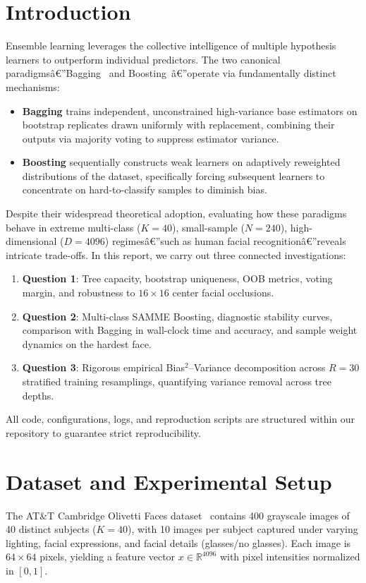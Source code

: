 \documentclass[10pt,twocolumn,letterpaper]{article}
\begin{document}
\section{Introduction}
\label{sec:intro}
Ensemble learning leverages the collective intelligence of multiple hypothesis learners to outperform individual predictors. The two canonical paradigmsâ€”Bagging~\cite{breiman1996bagging} and Boosting~\cite{zhu2009multi}â€”operate via fundamentally distinct mechanisms:
\begin{itemize}
    \item \textbf{Bagging} trains independent, unconstrained high-variance base estimators on bootstrap replicates drawn uniformly with replacement, combining their outputs via majority voting to suppress estimator variance.
    \item \textbf{Boosting} sequentially constructs weak learners on adaptively reweighted distributions of the dataset, specifically forcing subsequent learners to concentrate on hard-to-classify samples to diminish bias.
\end{itemize}

Despite their widespread theoretical adoption, evaluating how these paradigms behave in extreme multi-class ($K=40$), small-sample ($N=240$), high-dimensional ($D=4096$) regimesâ€”such as human facial recognitionâ€”reveals intricate trade-offs. In this report, we carry out three connected investigations:
\begin{enumerate}
    \item \textbf{Question 1}: Tree capacity, bootstrap uniqueness, OOB metrics, voting margin, and robustness to $16 \times 16$ center facial occlusions.
    \item \textbf{Question 2}: Multi-class SAMME Boosting, diagnostic stability curves, comparison with Bagging in wall-clock time and accuracy, and sample weight dynamics on the hardest face.
    \item \textbf{Question 3}: Rigorous empirical Bias$^2$--Variance decomposition across $R=30$ stratified training resamplings, quantifying variance removal across tree depths.
\end{enumerate}

All code, configurations, logs, and reproduction scripts are structured within our repository to guarantee strict reproducibility.

\section{Dataset and Experimental Setup}
\label{sec:setup}
The AT\&T Cambridge Olivetti Faces dataset~\cite{samaria1994parameterisation} contains 400 grayscale images of 40 distinct subjects ($K=40$), with 10 images per subject captured under varying lighting, facial expressions, and facial details (glasses/no glasses). Each image is $64 \times 64$ pixels, yielding a feature vector $x \in \mathbb{R}^{4096}$ with pixel intensities normalized in $[0, 1]$.
\end{document}
